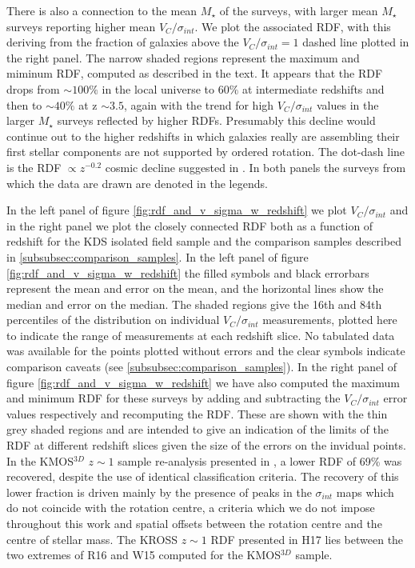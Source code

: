 \documentclass[fleqn,usenatbib]{mn2e}
\begin{document}
\begin{figure*}
{    There is also a connection to the mean $M_{\star}$ of the surveys, with larger mean $M_{\star}$ surveys reporting higher mean $V_{C}/\sigma_{int}$.
    We plot the associated RDF, with this deriving from the fraction of galaxies above the $V_{C}/\sigma_{int} = 1$ dashed line plotted in the right panel.
    The narrow shaded regions represent the maximum and miminum RDF, computed as described in the text.
    It appears that the RDF drops from $\sim 100\%$ in the local universe to $60\%$ at intermediate redshifts and then to $\sim 40\%$ at z $\sim 3.5$, again with the trend for high $V_{C}/\sigma_{int}$ values in the larger $M_{\star}$ surveys reflected by higher RDFs.
    Presumably this decline would continue out to the higher redshifts in which galaxies really are assembling their first stellar components are not supported by ordered rotation.
    The dot-dash line is the RDF $\propto z^{-0.2}$ cosmic decline suggested in \protect\cite{Stott2016}.
    In both panels the surveys from which the data are drawn are denoted in the legends.
}
    \label{fig:rdf_and_v_sigma_w_redshift}
\end{figure*}

In the left panel of figure \ref{fig:rdf_and_v_sigma_w_redshift} we plot $V_{C}/\sigma_{int}$ and in the right panel we plot the closely connected RDF both as a function of redshift for the KDS isolated field sample and the comparison samples described in \cref{subsubsec:comparison_samples}.
In the left panel of figure \ref{fig:rdf_and_v_sigma_w_redshift} the filled symbols and black errorbars represent the mean and error on the mean, and the horizontal lines show the median and error on the median.   
The shaded regions give the 16th and 84th percentiles of the distribution on individual $V_{C}/\sigma_{int}$ measurements, plotted here to indicate the range of measurements at each redshift slice.
No tabulated data was available for the points plotted without errors and the clear symbols indicate comparison caveats (see \cref{subsubsec:comparison_samples}).
In the right panel of figure \ref{fig:rdf_and_v_sigma_w_redshift} we have also computed the maximum and minimum RDF for these surveys by adding and subtracting the $V_{C}/\sigma_{int}$ error values respectively and recomputing the RDF.
These are shown with the thin grey shaded regions and are intended to give an indication of the limits of the RDF at different redshift slices given the size of the errors on the invidual points.
In the KMOS$^{3D}$ $z \sim 1$ sample re-analysis presented in \cite{Rodrigues2016}, a lower RDF of 69\% was recovered, despite the use of identical classification criteria.
The recovery of this lower fraction is driven mainly by the presence of peaks in the $\sigma_{int}$ maps which do not coincide with the rotation centre, a criteria which we do not impose throughout this work and spatial offsets between the rotation centre and the centre of stellar mass.
The KROSS $z\sim1$ RDF presented in H17 lies between the two extremes of R16 and W15 computed for the KMOS$^{3D}$ sample. \\
\end{document}
